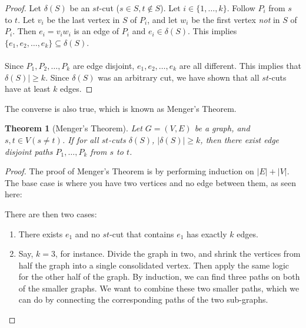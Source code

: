 \documentclass[]{article}
\newtheorem*{theorem}{Theorem}
\theoremstyle{definition}
\begin{document}
				\begin{proof}
					Let $\delta(S)$ be an $st$-cut ($s \in S, t \not \in S$). Let $i \in \{1, \ldots, k\}$. Follow $P_i$ from $s$ to $t$. Let $v_i$ be the last vertex in $S$ of $P_i$, and let $w_i$ be the first vertex \emph{not} in $S$ of $P_i$. Then $e_i = v_i w_i$ is an edge of $P_i$ and $e_i \in \delta(S)$. This implies $\{e_1, e_2, \ldots, e_k\} \subseteq \delta(S)$.
					\\ \\
					Since $P_1, P_2, \ldots, P_k$ are edge disjoint, $e_1, e_2, \ldots, e_k$ are all different. This implies that $\delta(S)| \ge k$. Since $\delta(S)$ was an arbitrary cut, we have shown that all $st$-cuts have at least $k$ edges.
				\end{proof}
			
				The converse is also true, which is known as Menger's Theorem.
			
				\begin{theorem}[Menger's Theorem]
					Let $G = (V, E)$ be a graph, and $s, t \in V (s \ne t)$. If for all $st$-cuts $\delta(S)$, $|\delta(S)| \ge k$, then there exist edge disjoint paths $P_1, \ldots, P_k$ from $s$ to $t$.
				\end{theorem}
			
				\begin{proof}
					The proof of Menger's Theorem is by performing induction on $|E| + |V|$. The base case is where you have two vertices and no edge between them, as seen here:
					\begin{center}
					\end{center}
				
					There are then two cases:
					\begin{enumerate}
						\item There exists $e_1$ and no $st$-cut that contains $e_1$ has exactly $k$ edges.
						\item Say, $k = 3$, for instance. Divide the graph in two, and shrink the vertices from half the graph into a single consolidated vertex. Then apply the same logic for the other half of the graph. By induction, we can find three paths on both of the smaller graphs. We want to combine these two smaller paths, which we can do by connecting the corresponding paths of the two sub-graphs.
					\end{enumerate}
				\end{proof}
\end{document}
